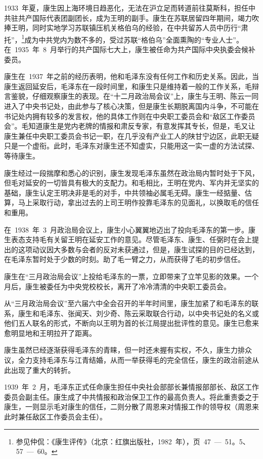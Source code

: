 1933~年夏，康生因上海环境日趋恶化，无法在沪立足而转道前往莫斯科，担任中共驻共产国际代表团副团长，成为王明的副手。康生在苏联居留四年期间，竭力吹捧王明，同时实地学习苏联镇压机关格伯乌的经验，在中共留苏人员中历行“肃托”，\footnote{参见仲侃：《康生评传》（北京：红旗出版社，1982~年），页~47~—~51。5、57~—~60。}成为中共党内为数不多的，受过苏联“格伯乌”全面熏陶的“专业人士”。在~1935~年~8~月举行的共产国际七大上，康生被任命为共产国际中央执委会候补委员。

康生在~1937~年之前的经历表明，他和毛泽东没有任何工作和历史关系。因此，当康生返回延安后，毛泽东在一段时间里，和康生只是维持着一般的工作关系，毛辩言鉴貌，仔细观察康生的表现。在“十二月政治局会议”上，康生与王明、陈云一同进入了中央书记处，由此参与了核心决策，但是康生长期脱离国内斗争，不可能在书记处内拥有较多的发言权，他的具体工作则在中央职工委员会和“敌区工作委员会”。毛知道康生是党内老牌的情报和肃反专家，有意发挥其专长，但是，毛又让康生兼任中央职工委员会书记一职，在几乎没有产业工人的陕甘宁边区，此职无疑只是一个虚衔。此时，毛泽东对康生还不知虚实，只能用这一实一虚的方法试探、等待康生。

康生经过一段揣摩和悉心的识别，康生发现毛泽东虽然在政治局内暂时处于下风，但毛对延安的一切皆具有极大的支配力。和毛相比，王明在党内、军内并无坚实的基础，康生认定王明决非是毛的对手，中共领袖必属毛无碍。康生一经掂量、估算，马上采取行动，拿出过去的上司王明作投靠毛泽东的见面礼，以换取毛的信任和重用。

在~1938~年~3~月政治局会议上，康生小心翼翼地迈出了投向毛泽东的第一步。康生表态支持毛有关留王明在延安工作的意见。尽管毛泽东、康生、任弼时在会上提出的这项动议因大多数与会者的反对未获通过，但是，康生试探的目的已经达到，在毛泽东暂时处于少数的时刻。助了毛一臂之力，从而获得了毛的初步信任。

康生在“三月政治局会议”上投给毛泽东的一票，立即带来了立竿见影的效果。一个月后，康生被委任为中央党校校长，离开了冷冷清清的中央职工委员会。

从“三月政治局会议”至六届六中全会召开的半年时间里，康生加紧了和毛泽东的联系，康生和毛泽东、张闻天、刘少奇、陈云采取联合行动，以中央书记处的名义或他们五人联名的形式，不断向以王明为首的长江局提出批评性的意见。康生已愈来愈明显地和王明拉开了距离。

康生虽然已经逐渐获得毛泽东的青睐，但一时还未握有实权，不久，康生力排众议，全力支持毛泽东与江青结婚，从而一举获得毛的完全信任，康生的政治前途从此出现了重大的转折。

1939~年~2~月，毛泽东正式任命康生担任中央社会部部长兼情报部部长、敌区工作委员会副主任。康生成了中共情报和政治保卫工作的最高负责人。将此重责委之于康生，一则显示毛对康生的信任，二则分散了周恩来对情报工作的领导权（周恩来此时兼任敌区工作委员会主任）。

